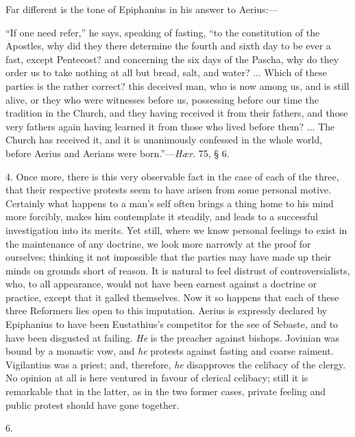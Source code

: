 Far different is the tone of Epiphanius in his answer to Aerius:—

``If one need refer,'' he says, speaking of fasting,
``to the constitution of the Apostles, why did they there
determine the fourth and sixth day to be ever a fast, except
Pentecost? and concerning the six days of the Pascha, why do they
order us to take nothing at all but bread, salt, and water? ... Which
of these parties is the rather correct? this deceived man, who is now
among us, and is still alive, or they who were witnesses before us,
possessing before our time the tradition in the Church, and they
having received it from their fathers, and
those very fathers again having learned it from those who lived before
them? ... The Church has received it, and it is unanimously confessed
in the whole world, before Aerius and Aerians were born.''—\emph{Hær}.
75, § 6.

4. Once more, there is this very observable fact in the case of
each of the three, that their respective protests seem to have arisen
from some personal motive. Certainly what happens to a man's self
often brings a thing home to his mind more forcibly, makes him
contemplate it steadily, and leads to a successful investigation into
its merits. Yet still, where we know personal feelings to exist in the
maintenance of any doctrine, we look more narrowly at the proof for
ourselves; thinking it not impossible that the parties may have made
up their minds on grounds short of reason. It is natural to feel
distrust of controversialists, who, to all appearance, would not have
been earnest against a doctrine or practice, except that it galled
themselves. Now it so happens that each of these three Reformers lies
open to this imputation. Aerius is expressly declared by Epiphanius to
have been Eustathius's competitor for the see of Sebaste, and to have
been disgusted at failing. \emph{He} is the preacher against bishops.
Jovinian was bound by a monastic vow, and \emph{he} protests against
fasting and coarse raiment. Vigilantius was a priest; and, therefore, \emph{he}
disapproves the celibacy of the clergy. No opinion at all is here
ventured in favour of clerical celibacy; still it is remarkable that
in the latter, as in the two former cases, private feeling and public
protest should have gone together.

6.


